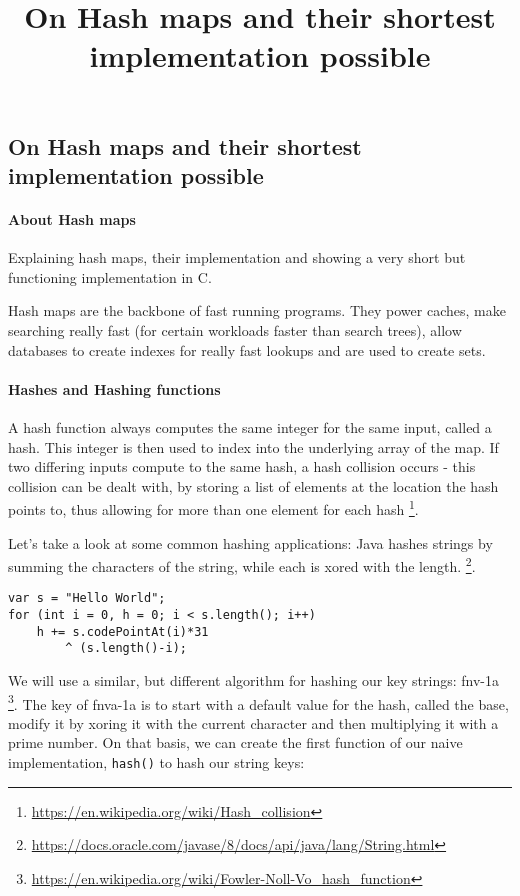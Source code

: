 

\title{On Hash maps and their shortest implementation possible}


    \subsection*{On Hash maps and their shortest implementation possible}

    \paragraph*{About Hash maps}

    Explaining hash maps, their implementation and showing a very short but
    functioning implementation in C.

    Hash maps are the backbone of fast running programs. They power
    caches, make searching really fast (for certain workloads faster than
    search trees), allow databases to create indexes for really fast
    lookups and are used to create sets.

    \paragraph*{Hashes and Hashing functions}

    A hash function always computes the same integer for the same input, called
    a hash. This integer is then used to index into the underlying array of the
    map. If two differing inputs compute to the same hash, a hash collision
    occurs - this collision can be dealt with, by storing a list of elements at
    the location the hash points to, thus allowing for more than one element
    for each hash
    \footnote{\href{https://en.wikipedia.org/wiki/Hash_collision}{https://en.wikipedia.org/wiki/Hash\_collision}}.

    Let's take a look at some common hashing applications: Java hashes strings
    by summing the characters of the string, while each is xored with the
    length. 
    \footnote{\href{https://docs.oracle.com/javase/8/docs/api/java/lang/String.html\#hashCode}{https://docs.oracle.com/javase/8/docs/api/java/lang/String.html}}.
    \begin{verbatim}
var s = "Hello World";
for (int i = 0, h = 0; i < s.length(); i++)
    h += s.codePointAt(i)*31 
        ^ (s.length()-i);
    \end{verbatim}

    We will use a similar, but different algorithm for hashing our key strings:
    fnv-1a
    \footnote{\href{https://en.wikipedia.org/wiki/Fowler-Noll-Vo_hash_function}{https://en.wikipedia.org/wiki/Fowler-Noll-Vo\_hash\_function}}.
    The key of fnva-1a is to start with a default value for the hash, called
    the base, modify it by xoring it with the current character and then
    multiplying it with a prime number. On that basis, we can create the first
    function of our naive implementation, \texttt{hash()} to hash our string
    keys:

